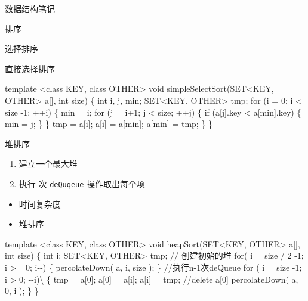 \documentclass[
  ignorenonframetext,
]{beamer}
\newenvironment{Shaded}{}{}
\newcommand{\NormalTok}[1]{#1}
\providecommand{\tightlist}{%
  \setlength{\itemsep}{0pt}\setlength{\parskip}{0pt}}
\begin{document}
\begin{frame}[fragile]{数据结构笔记}
\begin{block}{排序}
\begin{block}{选择排序}
\begin{block}{直接选择排序}
\begin{Shaded}
\begin{Highlighting}[]
\NormalTok{template \textless{}class KEY, class OTHER\textgreater{}}
\NormalTok{void simpleSelectSort(SET\textless{}KEY, OTHER\textgreater{} a[], int size)}
\NormalTok{\{}
\NormalTok{  int i, j, min;}
\NormalTok{  SET\textless{}KEY, OTHER\textgreater{} tmp;}
\NormalTok{  for (i = 0; i \textless{} size {-}1; ++i)}
\NormalTok{  \{}
\NormalTok{  min = i;}
\NormalTok{  for (j = i+1; j \textless{} size; ++j)}
\NormalTok{  \{}
\NormalTok{    if (a[j].key \textless{} a[min].key)}
\NormalTok{    \{}
\NormalTok{      min = j;}
\NormalTok{    \}}
\NormalTok{  \}}
\NormalTok{  tmp = a[i]; a[i] = a[min]; a[min] = tmp;}
\NormalTok{  \}}
\NormalTok{\}}
\end{Highlighting}
\end{Shaded}
\end{block}

\begin{block}{堆排序}
\protect{}\label{ux5806ux6392ux5e8f}
\begin{enumerate}
\tightlist
\item
  建立一个最大堆
\item
  执行 {} 次 \texttt{deQuqeue} 操作取出每个项
\end{enumerate}

\begin{itemize}
\item
  时间复杂度 {}
\item
  堆排序
\end{itemize}

\begin{Shaded}
\begin{Highlighting}[]
\NormalTok{template \textless{}class KEY, class OTHER\textgreater{}}
\NormalTok{void heapSort(SET\textless{}KEY, OTHER\textgreater{} a[], int size)}
\NormalTok{\{}
\NormalTok{  int i;}
\NormalTok{  SET\textless{}KEY, OTHER\textgreater{} tmp; // 创建初始的堆}
\NormalTok{  for( i = size / 2 {-}1; i \textgreater{}= 0; i{-}{-})}
\NormalTok{  \{}
\NormalTok{    percolateDown( a, i, size );}
\NormalTok{  \}}
\NormalTok{  //执行n{-}1次deQueue}
\NormalTok{  for ( i = size {-}1; i \textgreater{} 0; {-}{-}i)\textbackslash{}}
\NormalTok{  \{}
\NormalTok{  tmp = a[0]; a[0] = a[i]; a[i] = tmp; //delete a[0]}
\NormalTok{  percolateDown( a, 0, i );}
\NormalTok{  \}}
\NormalTok{\}}
\end{Highlighting}
\end{Shaded}


\end{block}
\end{block}
\end{block}
\end{frame}
\end{document}
